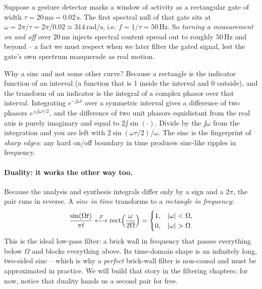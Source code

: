 \begin{example}[A $20\,$ms gate]
\label{ch07:ex-gate}
Suppose a gesture detector marks a window of activity as a rectangular gate of width
$\tau = 20\,\text{ms} = 0.02\,\text{s}$. The first spectral null of that gate sits at
$\omega = 2\pi/\tau = 2\pi/0.02 \approx 314\,\text{rad/s}$, i.e. $f = 1/\tau = 50\,$Hz.
So \emph{turning a measurement on and off} over $20\,$ms injects spectral content
spread out to roughly $50\,$Hz and beyond -- a fact we must respect when we later filter
the gated signal, lest the gate's own spectrum masquerade as real motion.
\end{example}

\begin{whybox}
Why a sinc and not some other curve? Because a rectangle is the indicator function of an interval (a function that is 1 inside the interval and 0 outside),
and the transform of an indicator is the integral of a complex phasor over that interval.
Integrating $e^{-\jj\omega t}$ over a symmetric interval gives a difference of two phasors
$e^{\pm\jj\omega\tau/2}$, and the difference of two unit phasors equidistant from the real
axis is purely imaginary and equal to $2\jj\sin(\cdot)$. Divide by the $\jj\omega$ from
the integration and you are left with $2\sin(\omega\tau/2)/\omega$. The sinc is the
fingerprint of \emph{sharp edges}: any hard on/off boundary in time produces sinc-like
ripples in frequency.
\end{whybox}

\paragraph{Duality: it works the other way too.}
Because the analysis and synthesis integrals differ only by a sign and a $2\pi$, the pair
runs in reverse. A \emph{sinc in time} transforms to a \emph{rectangle in frequency}:
\begin{equation}
\label{ch07:dual}
\frac{\sin(\Omega t)}{\pi t} \overset{\mathcal{F}}{\longleftrightarrow}
\operatorname{rect}\!\left(\frac{\omega}{2\Omega}\right)
=\begin{cases}1,&\lvert\omega\rvert<\Omega,\\0,&\lvert\omega\rvert>\Omega.\end{cases}
\end{equation}
This is the ideal low-pass filter: a brick wall in frequency that passes everything below
$\Omega$ and blocks everything above. Its time-domain shape is an infinitely long,
two-sided sinc -- which is why a \emph{perfect} brick-wall filter is non-causal and must
be approximated in practice. We will build that story in the filtering chapters; for now,
notice that duality hands us a second pair for free.

